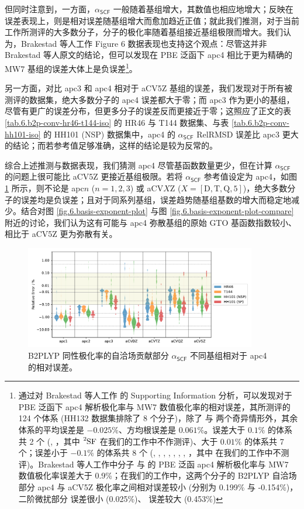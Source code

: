 但同时注意到，一方面，$\alpha_\textsf{SCF}$ 一般随着基组增大，其数值也相应地增大；反映在误差表现上，则是相对误差随基组增大而愈加趋近正值；就此我们推测，对于当前工作所测评的大多数分子，分子的极化率随着基组接近基组极限而增大。我们认为，Brakestad 等人工作\cite{Brakestad-Frediani.JCTC.2020} Figure 6 数据表现也支持这个观点：尽管这并非 Brakestad 等人原文的结论，但可以发现在 PBE 泛函下 apc4 相比于更为精确的 MW7 基组的误差大体上是负误差\footnote{通过对 Brakestad 等人工作\cite{Brakestad-Frediani.JCTC.2020} 的 Supporting Information 分析，可以发现对于 PBE 泛函下 apc4 解析极化率与 MW7 数值极化率的相对误差，其所测评的 124 个体系 (HH132 数据集排除了 8 个分子)，除了  与  两个奇异情形外，其余体系的平均误差是 $-0.025\%$、方均根误差是 $0.061\%$。误差大于 $0.1\%$ 的体系共 2 个 (, ，其中 $\ce{^2SF}$ 在我们的工作中不作测评)、大于 $0.01\%$ 的体系共 7 个；误差小于 $-0.1\%$ 的体系共 8 个 (, , , , , , , ，其中  在我们的工作中不测评)。Brakestad 等人工作中分子  与  的 PBE 泛函 apc4 解析极化率与 MW7 数值极化率误差大于 0.9\%；在我们的工作中，这两个分子的 B2PLYP 自洽场部分 apc4 与 aCV5Z 极化率之间相对误差较小 (分别为 0.199\% 与 -0.154\%)，二阶微扰部分  误差很小 (0.025\%)、 误差较大 (0.453\%)}。

另一方面，对比 apc3 和 apc4 相对于 aCV5Z 基组的误差，我们发现对于所有被测评的数据集，绝大多数分子的 apc4 误差都大于零；而 apc3 作为更小的基组，尽管有更广的误差分布，但更多分子的误差反而更接近于零；这照应了正文的表 \ref{tab.6.b2p-conv-hr46-t144-iso} 的 HR46 与 T144 数据集、与表 \ref{tab.6.b2p-conv-hh101-iso} 的 HH101 (NSP) 数据集中，apc4 的 $\alpha_\textsf{SCF}$ RelRMSD 误差比 apc3 更大的结论；而若参考值足够准确，这样的结论是较为反常的。

综合上述推测与数据表现，我们猜测 apc4 尽管基函数数量更少，但在计算 $\alpha_\textsf{SCF}$ 的问题上很可能比 aCV5Z 更接近基组极限。若将 $\alpha_\textsf{SCF}$ 参考值设定为 apc4，如图 \ref{fig.6.converg-b2p-scf-apc4} 所示，则不论是 apc$n$ ($n=1,2,3$) 或 aCV$X$Z ($X = \mathrm{[D,T,Q,5]}$)，绝大多数分子的误差均是负误差；且对于同系列基组，误差趋势随基组基数的增大而稳定地减少。结合对图 \ref{fig.6.basis-exponent-plot} 与图 \ref{fig.6.basis-exponent-plot-compare} 附近的讨论，我们认为这有可能与 apc4 弥散基组的原始 GTO 基函数指数较小、相比于 aCV5Z 更为弥散有关。

\begin{figure}[ht]
    \centering
    \caption{B2PLYP 同性极化率的自洽场贡献部分 $\alpha_\textsf{SCF}$ 不同基组相对于 apc4 的相对误差。}
    \label{fig.6.converg-b2p-scf-apc4}
    \includegraphics[width=0.9\textwidth]{assets/converg-b2p-scf-apc4.pdf}
\end{figure}

